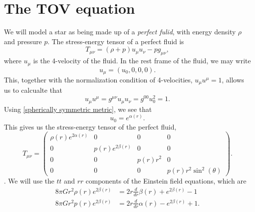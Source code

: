 \section{The TOV equation}

We will model a star as being made up of a \emph{perfect fulid}, with energy density $\rho$ and pressure $p$.
The stress-energy tensor of a perfect fluid is
%
\begin{equation}
    T_{\mu \nu} = (\rho + p) u_\mu u_\nu - p g_{\mu \nu},
\end{equation} 
where $u_\mu$ is the 4-velocity of the fluid.
In the rest frame of the fluid, we may write 
\begin{equation}
    u_\mu = \left(u_0, 0, 0, 0\right).
\end{equation}
This, together with the normalization condition of 4-velocities, $u_\mu u^\mu = 1$, allows us to calcualte that
%
\begin{equation}
    u_\mu u^\mu = g^{\mu \nu} u_\mu u_\nu = g^{00} u_0^2 = 1.
\end{equation}
%
Using \autoref{spherically symmetric metric}, we see that
\begin{equation}
    u_0 = e^{\alpha(r)}.
\end{equation}
%
This gives us the stress-energy tensor of the perfect fluid,
%
\begin{equation}
    T_{\mu \nu} 
    =
    \left(
        \begin{matrix}
            \rho{\left(r \right)} e^{2 \alpha{\left(r \right)}} & 0 & 0 & 0\\0 & 
            p{\left(r \right)} e^{2 \beta{\left(r \right)}} & 0 & 0\\
            0 & 0 & p{\left(r \right)} r^{2} & 0\\
            0 & 0 & 0 & p{\left(r \right)} r^{2} \sin^{2}{\left(\theta \right)}
        \end{matrix}
    \right).
\end{equation}.
%
We will use the $tt$ and $rr$ components of the Einstein field equations, which are
%
\begin{align}
    \label{tt equation}
    8 \pi G r^{2} \rho{\left(r \right)} e^{2 \beta{\left(r \right)}} 
    & =   2 r \frac{d}{d r} \beta{\left(r \right)} + e^{2 \beta{\left(r \right)}} - 1 \\
    \label{rr equation}
    8 \pi G r^{2} p{\left(r \right)} e^{2 \beta{\left(r \right)}} 
    & = 2 r \frac{d}{d r} \alpha{\left(r \right)} - e^{2 \beta{\left(r \right)}} + 1.
\end{align}
